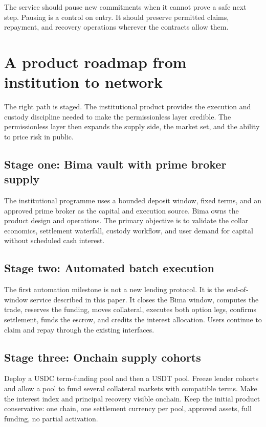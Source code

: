 \documentclass[11pt,oneside]{article}
\begin{document}
The service should pause new commitments when it cannot prove a safe next step. Pausing is a control on entry. It should preserve permitted claims, repayment, and recovery operations wherever the contracts allow them.

\section{A product roadmap from institution to network}

The right path is staged. The institutional product provides the execution and custody discipline needed to make the permissionless layer credible. The permissionless layer then expands the supply side, the market set, and the ability to price risk in public.

\subsection{Stage one: Bima vault with prime broker supply}

The institutional programme uses a bounded deposit window, fixed terms, and an approved prime broker as the capital and execution source. Bima owns the product design and operations. The primary objective is to validate the collar economics, settlement waterfall, custody workflow, and user demand for capital without scheduled cash interest.

\subsection{Stage two: Automated batch execution}

The first automation milestone is not a new lending protocol. It is the end-of-window service described in this paper. It closes the Bima window, computes the trade, reserves the funding, moves collateral, executes both option legs, confirms settlement, funds the escrow, and credits the interest allocation. Users continue to claim and repay through the existing interfaces.

\subsection{Stage three: Onchain supply cohorts}

Deploy a USDC term-funding pool and then a USDT pool. Freeze lender cohorts and allow a pool to fund several collateral markets with compatible terms. Make the interest index and principal recovery visible onchain. Keep the initial product conservative: one chain, one settlement currency per pool, approved assets, full funding, no partial activation.
\end{document}
